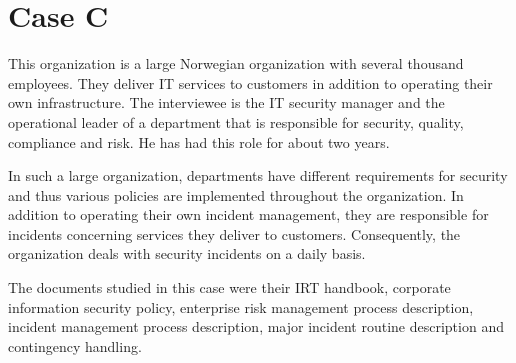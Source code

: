\section{Case C}
This organization is a large Norwegian organization with several thousand employees. They deliver IT services to customers in addition to operating their own infrastructure. The interviewee is the IT security manager  and the operational leader of a department that is responsible for security, quality, compliance and risk. He has had this role for about two years.

In such a large organization, departments have different requirements for security and thus various policies are implemented throughout the organization. In addition to operating their own incident management, they are responsible for incidents concerning services they deliver to customers. Consequently, the organization deals with security incidents on a daily basis. 

The documents studied in this case were their \ac{IRT} handbook, corporate information security policy, enterprise risk management process description, incident management process description, major incident routine description and contingency handling.